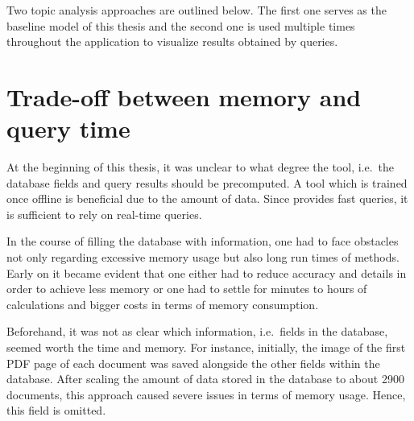 Two topic analysis approaches are outlined below.
The first one serves as the baseline model of this thesis and 
the second one is used multiple times throughout the application to visualize results obtained by queries.










\section{Trade-off between memory and query time}\label{sec:trade-off}

At the beginning of this thesis, it was unclear to what degree the tool, 
i.e.\ the database fields and query results should be precomputed.
A tool which is trained once offline is beneficial due to the amount of data.
Since \databaseName{} provides fast queries, it is sufficient to rely on real-time queries.

In the course of filling the database with information, 
one had to face obstacles not only regarding excessive memory usage but also long run times of methods.
Early on it became evident that one either had to reduce accuracy and details in order to achieve less memory or 
one had to settle for minutes to hours of calculations and bigger costs in terms of memory consumption.

Beforehand, it was not as clear which information, i.e.\ fields in the database, seemed worth the time and memory.
For instance, initially, the image of the first PDF page of each document was saved alongside the other fields within the database.
After scaling the amount of data stored in the database to about 2900 documents, 
this approach caused severe issues in terms of memory usage.
Hence, this field is omitted.